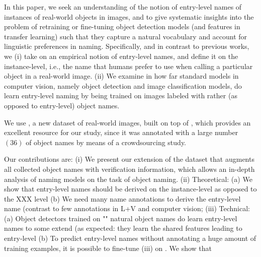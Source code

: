 In this paper, we seek an understanding of the notion of entry-level names of instances of real-world objects in images, and to give systematic insights into the problem of retraining or fine-tuning object detection models (and features in transfer learning) such that they capture a natural vocabulary and account for linguistic preferences in naming. %
Specifically, and in contrast to previous works, we 
(i) take on an empirical notion of entry-level names, and define it on the instance-level, i.e., the name that humans prefer to use when calling a particular object in a real-world image.   
(ii) We examine in how far standard models in computer vision, namely object detection and image classification models, do learn entry-level naming by being trained on images labeled with rather \textit{\arbitrary} (as opposed to entry-level) object names. 

We use \mn, a new dataset of real-world images, built on top of \vg, which provides an excellent resource for our study, since it was annotated with a large number\ $(36)$ of object names by means of a crowdsourcing study.

Our contributions are: 
(i) We present our extension of the \mn dataset that augments all collected object names with verification information, which allows an in-depth analysis of naming models on the task of object naming. 
(ii) Theoretical:
(a) We show that entry-level names should be derived on the instance-level as opposed to the XXX level 
(b) We need many name annotations to derive the entry-level name (contrast to few annotations in L+V and computer vision; 
(iii) Technical:
(a) Object detectors trained on "\arbitrary" natural object names do learn entry-level names to some extend (as expected: they learn the shared features leading to entry-level 
(b) To predict entry-level names without annotating a huge amount of training examples, it is possible to fine-tune (iii) on \mn. We show that 

\fi
